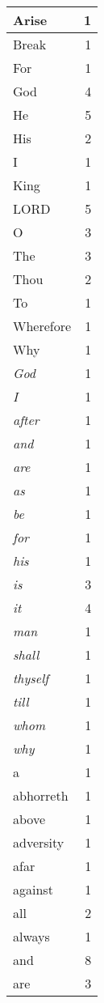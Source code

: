 \begin{center}
\begin{longtable}{l|r}
\hline \hline
\endlastfoot
Arise & 1 \\ \hline
Break & 1 \\ \hline
For & 1 \\ \hline
God & 4 \\ \hline
He & 5 \\ \hline
His & 2 \\ \hline
I & 1 \\ \hline
King & 1 \\ \hline
LORD & 5 \\ \hline
O & 3 \\ \hline
The & 3 \\ \hline
Thou & 2 \\ \hline
To & 1 \\ \hline
Wherefore & 1 \\ \hline
Why & 1 \\ \hline
\emph{God} & 1 \\ \hline
\emph{I} & 1 \\ \hline
\emph{after} & 1 \\ \hline
\emph{and} & 1 \\ \hline
\emph{are} & 1 \\ \hline
\emph{as} & 1 \\ \hline
\emph{be} & 1 \\ \hline
\emph{for} & 1 \\ \hline
\emph{his} & 1 \\ \hline
\emph{is} & 3 \\ \hline
\emph{it} & 4 \\ \hline
\emph{man} & 1 \\ \hline
\emph{shall} & 1 \\ \hline
\emph{thyself} & 1 \\ \hline
\emph{till} & 1 \\ \hline
\emph{whom} & 1 \\ \hline
\emph{why} & 1 \\ \hline
a & 1 \\ \hline
abhorreth & 1 \\ \hline
above & 1 \\ \hline
adversity & 1 \\ \hline
afar & 1 \\ \hline
against & 1 \\ \hline
all & 2 \\ \hline
always & 1 \\ \hline
and & 8 \\ \hline
are & 3 \\ \hline

\end{longtable}
\end{center}
